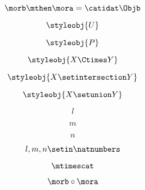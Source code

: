 \begin{forslides}
    \begin{equation}
        \label{eq:semicats-slides-32}
        \morb \mthen \mora = \catidat\Objb
    \end{equation}

    \begin{equation}
        \label{eq:semicats-slides-33}
        \styleobj{U}
    \end{equation}

    \begin{equation}
        \label{eq:semicats-slides-34}
        \styleobj{P}
    \end{equation}

    \begin{equation}
        \label{eq:semicats-slides-35}
        \styleobj{X \Ctimes Y}
    \end{equation}

    \begin{equation}
        \label{eq:semicats-slides-36}
        \styleobj{X \setintersection Y}
    \end{equation}

    \begin{equation}
        \label{eq:semicats-slides-37}
        \styleobj{X \setunion Y}
    \end{equation}

    \begin{equation}
        \label{eq:semicats-slides-38}
        l
    \end{equation}

    \begin{equation}
        \label{eq:semicats-slides-39}
        m
    \end{equation}

    \begin{equation}
        \label{eq:semicats-slides-40}
        n
    \end{equation}

    \begin{equation}
        \label{eq:semicats-slides-41}
        l, m, n \setin \natnumbers
    \end{equation}

    \begin{equation}
        \label{eq:semicats-slides-42}
        \mtimescat
    \end{equation}

    \begin{equation}
        \label{eq:semicats-slides-43}
        \morb \circ \mora
    \end{equation}


\end{forslides}
